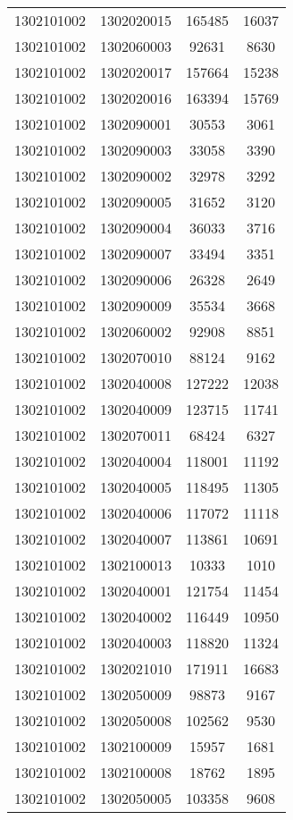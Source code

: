 \begin{longtable}[h]{llcc}
		1302101002 & 1302020015 & 165485 & 16037\\
		1302101002 & 1302060003 & 92631 & 8630\\
		1302101002 & 1302020017 & 157664 & 15238\\
		1302101002 & 1302020016 & 163394 & 15769\\
		1302101002 & 1302090001 & 30553 & 3061\\
		1302101002 & 1302090003 & 33058 & 3390\\
		1302101002 & 1302090002 & 32978 & 3292\\
		1302101002 & 1302090005 & 31652 & 3120\\
		1302101002 & 1302090004 & 36033 & 3716\\
		1302101002 & 1302090007 & 33494 & 3351\\
		1302101002 & 1302090006 & 26328 & 2649\\
		1302101002 & 1302090009 & 35534 & 3668\\
		1302101002 & 1302060002 & 92908 & 8851\\
		1302101002 & 1302070010 & 88124 & 9162\\
		1302101002 & 1302040008 & 127222 & 12038\\
		1302101002 & 1302040009 & 123715 & 11741\\
		1302101002 & 1302070011 & 68424 & 6327\\
		1302101002 & 1302040004 & 118001 & 11192\\
		1302101002 & 1302040005 & 118495 & 11305\\
		1302101002 & 1302040006 & 117072 & 11118\\
		1302101002 & 1302040007 & 113861 & 10691\\
		1302101002 & 1302100013 & 10333 & 1010\\
		1302101002 & 1302040001 & 121754 & 11454\\
		1302101002 & 1302040002 & 116449 & 10950\\
		1302101002 & 1302040003 & 118820 & 11324\\
		1302101002 & 1302021010 & 171911 & 16683\\
		1302101002 & 1302050009 & 98873 & 9167\\
		1302101002 & 1302050008 & 102562 & 9530\\
		1302101002 & 1302100009 & 15957 & 1681\\
		1302101002 & 1302100008 & 18762 & 1895\\
		1302101002 & 1302050005 & 103358 & 9608\\

\end{longtable}
